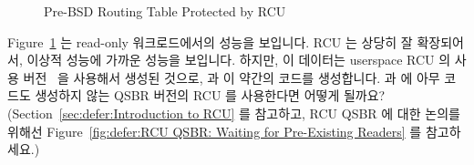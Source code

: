 \begin{figure}[tb]
\centering
{}
\caption{Pre-BSD Routing Table Protected by RCU}
\label{fig:defer:Pre-BSD Routing Table Protected by RCU}
\end{figure}

Figure~\ref{fig:defer:Pre-BSD Routing Table Protected by RCU}
는 read-only 워크로드에서의 성능을 보입니다.
RCU 는 상당히 잘 확장되어서, 이상적 성능에 가까운 성능을 보입니다.
하지만, 이 데이터는 userspace RCU 의  사용
버전~\cite{MathieuDesnoyers2009URCU,PaulMcKenney2013LWNURCU} 을 사용해서 생성된
것으로,  과  이 약간의 코드를
생성합니다.
 과  에 아무 코드도 생성하지 않는
QSBR 버전의 RCU 를 사용한다면 어떻게 될까요?
(Section~\ref{sec:defer:Introduction to RCU} 를 참고하고, RCU QSBR 에 대한
논의를 위해선
Figure~\ref{fig:defer:RCU QSBR: Waiting for Pre-Existing Readers} 를
참고하세요.)

